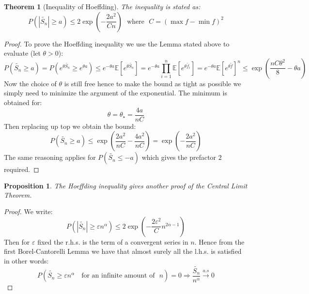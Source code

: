\documentclass[10pt,a4paper]{book}
\newtheorem{theorem}{Theorem}[section]
\newtheorem{proposition}{Proposition}[section]
\theoremstyle{definition}
\begin{document}
\begin{theorem}[Inequality of Hoeffding]
The inequality is stated as:
\[
P(|\tilde{S_n} | \geq a) \leq 2 \exp(-\frac{2 a^2}{C n}) \mbox{~~where~~} C = (\max f - \min f)^2
\]
\end{theorem}

\begin{proof}
To prove the Hoeffding inequality we use the Lemma stated above to evaluate (let $\theta > 0$):
\[
P(\tilde{S_n} \geq a) = P(e^{\theta \tilde{S_n}} \geq e^{\theta a}) \leq e^{-\theta a} \mathbb{E}[e^{\theta \tilde{S_n}}] = e^{-\theta a} \prod_{i = 1}^n \mathbb{E}[e^{\theta \tilde{f_i}}] = e^{-\theta a} \mathbb{E}[e^{\theta \tilde{f}}]^n \leq \exp(\frac{n C \theta^2}{8} - \theta a)
\]
Now the choice of $\theta$ is still free hence to make the bound as tight as possible we simply need to minimize the argument of the exponential. The minimum is obtained for:
\[
\theta = \theta_\star = \frac{4a}{nC}
\]
Then replacing up top we obtain the bound:
\[
P(\tilde{S_n} \geq a) \leq \exp( \frac{2a^2}{nC} - \frac{4a^2}{nC}) = \exp(-\frac{2a^2}{nC})
\]
The same reasoning applies for $P(\tilde{S_n} \leq -a)$ which gives the prefactor $2$ required. 
\end{proof}

\begin{proposition}
The Hoeffding inequality gives another proof of the Central Limit Theorem.
\end{proposition}

\begin{proof}
We write:
\[
P(|\tilde{S_n}| \geq \varepsilon n^\alpha) \leq 2 \exp(-\frac{2 \varepsilon^2}{C} n^{2 \alpha - 1})
\]
Then for $\varepsilon$ fixed the r.h.s. is the term of a convergent series in $n$. Hence from the first Borel-Cantorelli Lemma we have that almost surely all the l.h.s. is satisfied in other words:
\[
P(\tilde{S_n} \geq \varepsilon n^\alpha \mbox{~~ for an infinite amount of~~} n) = 0 \Rightarrow \frac{\tilde{S_n}}{n^\alpha} \stackrel{a.s}{\longrightarrow} 0
\]
\end{proof}
\end{document}

